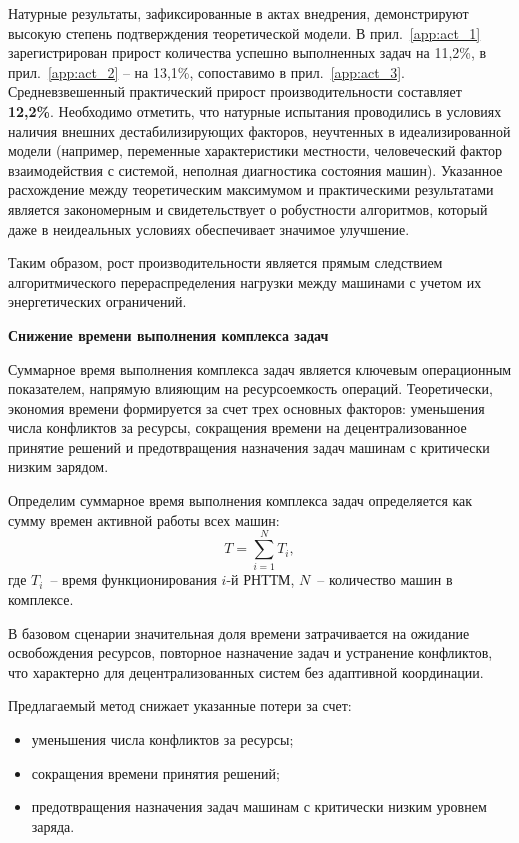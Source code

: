Натурные результаты, зафиксированные в актах внедрения, демонстрируют высокую степень подтверждения теоретической модели. В прил.~\ref{app:act_1} зарегистрирован прирост количества успешно выполненных задач на 11,2\%, в прил.~\ref{app:act_2} -- на 13,1\%, сопоставимо в прил.~\ref{app:act_3}. Средневзвешенный практический прирост производительности составляет \textbf{12,2\%}. Необходимо отметить, что натурные испытания проводились в условиях наличия внешних дестабилизирующих факторов, неучтенных в идеализированной модели (например, переменные характеристики местности, человеческий фактор взаимодействия с системой, неполная диагностика состояния машин). Указанное расхождение между теоретическим максимумом и практическими результатами является закономерным и свидетельствует о робустности алгоритмов, который даже в неидеальных условиях обеспечивает значимое улучшение.

Таким образом, рост производительности является прямым следствием алгоритмического перераспределения нагрузки между машинами с учетом их энергетических ограничений.

\textbf{Снижение времени выполнения комплекса задач}

Суммарное время выполнения комплекса задач является ключевым операционным показателем, напрямую влияющим на ресурсоемкость операций. Теоретически, экономия времени формируется за счет трех основных факторов: уменьшения числа конфликтов за ресурсы, сокращения времени на децентрализованное принятие решений и предотвращения назначения задач машинам с критически низким зарядом.

Определим суммарное время выполнения комплекса задач определяется как сумму времен активной работы всех машин:
\begin{equation}
	T = \sum_{i=1}^{N} T_i,
\end{equation}
где $T_i$~-- время функционирования $i$-й РНТТМ, $N$~-- количество машин в комплексе.

В базовом сценарии значительная доля времени затрачивается на ожидание освобождения ресурсов, повторное назначение задач и устранение конфликтов, что характерно для децентрализованных систем без адаптивной координации.

Предлагаемый метод снижает указанные потери за счет:
\begin{itemize}[beginpenalty=10000, midpenalty=10000, wide=\parindent, leftmargin=0pt]
	\item уменьшения числа конфликтов за ресурсы;
	\item сокращения времени принятия решений;
	\item предотвращения назначения задач машинам с критически низким уровнем заряда.
\end{itemize}

